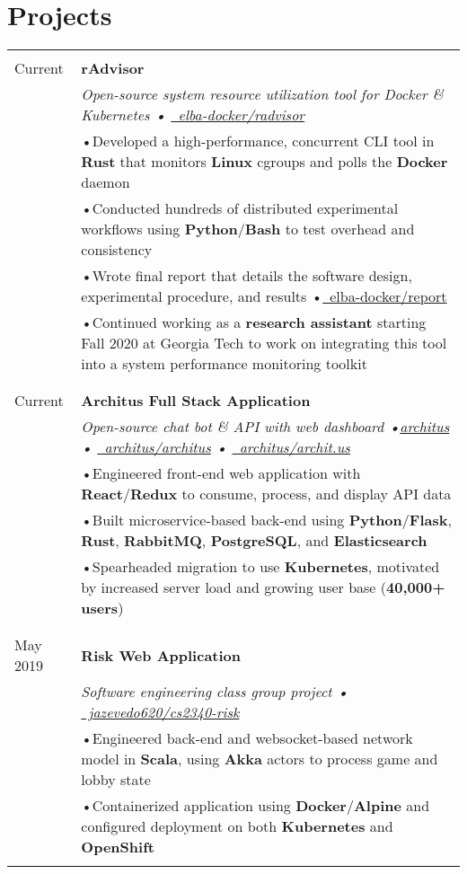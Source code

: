 \documentclass[a4paper,11pt]{article}
\newcommand{\lcolwidth}{2.2cm}
\newcommand{\lcolwidthinner}{2.1cm}
\newcommand{\rcolwidth}{16.2cm}
\newenvironment{rsection}[1]
  {
    \section{#1}
    \begin{tabular}{>{\raggedleft\arraybackslash}p{\lcolwidth}|p{\rcolwidth}}
   } {
    \\\multicolumn{2}{c}{} \\[-10pt]
    \end{tabular}
  }
\newcommand{\rheader}[2]{
    \multirow[t]{2}{*}{
        \begin{minipage}[t]{\lcolwidthinner}
            \begin{flushright}
                \textsc{#1}
            \end{flushright}
        \end{minipage}
    } & \textbf{#2}
}
\newcommand{\rdesc}[1]{
  \\[-2pt]&\small{\emph{#1}\vspace{1pt} }
}
\newcommand{\ritem}[2][ •\hspace{3pt}]{\\[-2pt]& \footnotesize{#1#2}}
\newcommand{\rskip}{\\\multicolumn{2}{c}{} \\[-5pt]}
\newcommand{\rdot}{\xspace\hspace{0pt}•\hspace{3pt}\xspace}
\begin{document}
\begin{rsection}{Projects}
  \rheader{Feb 2020 -\\[-1pt] Current}{rAdvisor}
  \rdesc{Open-source system resource utilization tool for Docker \& Kubernetes
    {\normalfont \rdot
    \href{https://github.com/elba-docker/radvisor}{\faGithub\ elba-docker/radvisor}}}
  \ritem{Developed a high-performance, concurrent CLI tool in \textbf{Rust}
    that monitors \textbf{Linux} cgroups and polls the \textbf{Docker} daemon}
  \ritem{Conducted hundreds of distributed experimental workflows
    using \textbf{Python}/\textbf{Bash} to test overhead and consistency}
  \ritem{Wrote final report that details the software design, experimental procedure, and results
    \rdot \href{https://github.com/elba-docker/report}{\faGithub\ elba-docker/report}}
  \ritem{Continued working as a \textbf{research assistant} starting Fall 2020
    at Georgia Tech to work on integrating this tool into a system
    \newline\hphantom{t\,} performance monitoring toolkit}
  \rskip

  \rheader{May 2019 -\\[-1pt] Current}{Architus Full Stack Application}
  \rdesc{Open-source chat bot \& API with web dashboard
    {\normalfont \rdot \href{https://archit.us/}{architus} \rdot
        \href{https://github.com/architus/architus}{\faGithub\ architus/architus} \rdot
        \href{https://github.com/architus/archit.us}{\faGithub\ architus/archit.us}}}
  \ritem{Engineered front-end web application with \textbf{React}/\textbf{Redux}
    to consume, process, and display API data}
  \ritem{Built microservice-based back-end using \textbf{Python}/\textbf{Flask},
    \textbf{Rust}, \textbf{RabbitMQ}, \textbf{PostgreSQL}, and \textbf{Elasticsearch}}
  \ritem{Spearheaded migration to use \textbf{Kubernetes}, motivated by
    increased server load and growing user base (\textbf{40,000+ users})}
  \rskip

  \rheader{Jan 2019 -\\[-1pt] May 2019}{Risk Web Application}
  \rdesc{Software engineering class group project
    {\normalfont \rdot
    \href{https://github.com/jazevedo620/cs2340-risk}{\faGithub\ jazevedo620/cs2340-risk}}}
  \ritem{Engineered back-end and websocket-based network model in \textbf{Scala},
    using \textbf{Akka} actors to process game and lobby state}
  \ritem{Containerized application using \textbf{Docker}/\textbf{Alpine}
    and configured deployment on both \textbf{Kubernetes} and \textbf{OpenShift}}
\end{rsection}
\end{document}
